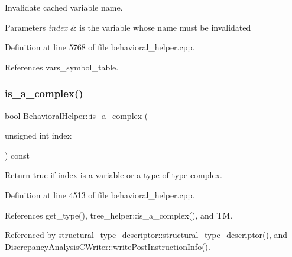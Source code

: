 Invalidate cached variable name. 


\begin{DoxyParams}{Parameters}
{\em index} & is the variable whose name must be invalidated \\
\hline
\end{DoxyParams}


Definition at line 5768 of file behavioral\+\_\+helper.\+cpp.



References vars\+\_\+symbol\+\_\+table.

\mbox{\label{classBehavioralHelper_a7429077b95289a4988649bc8cc58ae06}} 
\subsubsection{\texorpdfstring{is\+\_\+a\+\_\+complex()}{is\_a\_complex()}}
{\footnotesize\ttfamily bool Behavioral\+Helper\+::is\+\_\+a\+\_\+complex (\begin{DoxyParamCaption}\item[{unsigned int}]{index }\end{DoxyParamCaption}) const\hspace{0.3cm}{\ttfamily [virtual]}}



Return true if index is a variable or a type of type complex. 



Definition at line 4513 of file behavioral\+\_\+helper.\+cpp.



References get\+\_\+type(), tree\+\_\+helper\+::is\+\_\+a\+\_\+complex(), and TM.



Referenced by structural\+\_\+type\+\_\+descriptor\+::structural\+\_\+type\+\_\+descriptor(), and Discrepancy\+Analysis\+C\+Writer\+::write\+Post\+Instruction\+Info().

